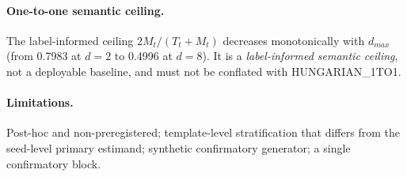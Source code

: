 \paragraph{One-to-one semantic ceiling.} The label-informed ceiling
$2M_t/(T_t+M_t)$ decreases monotonically with $d_{max}$ (from
0.7983 at $d=2$ to
0.4996 at $d=8$). It is a
\emph{label-informed semantic ceiling}, not a deployable baseline, and must not be
conflated with HUNGARIAN\_1TO1.

\paragraph{Limitations.} Post-hoc and non-preregistered; template-level stratification
that differs from the seed-level primary estimand; synthetic confirmatory generator; a
single confirmatory block.
